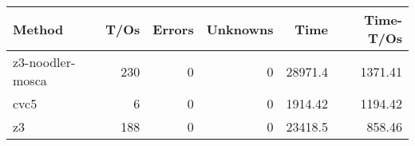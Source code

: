 \begin{tabular}{lrrrrr}
\hline
 Method           &   T/Os &   Errors &   Unknowns &     Time &   Time-T/Os \\
\hline
 z3-noodler-mosca &    230 &        0 &          0 & 28971.4  &     1371.41 \\
 cvc5             &      6 &        0 &          0 &  1914.42 &     1194.42 \\
 z3               &    188 &        0 &          0 & 23418.5  &      858.46 \\
\hline
\end{tabular}
